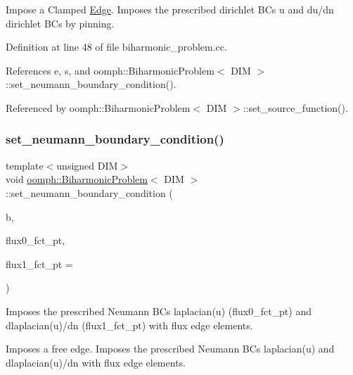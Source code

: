 Impose a Clamped \hyperlink{classoomph_1_1Edge}{Edge}. Imposes the prescribed dirichlet B\+Cs u and du/dn dirichlet B\+Cs by pinning. 

Definition at line 48 of file biharmonic\+\_\+problem.\+cc.



References e, s, and oomph\+::\+Biharmonic\+Problem$<$ D\+I\+M $>$\+::set\+\_\+neumann\+\_\+boundary\+\_\+condition().



Referenced by oomph\+::\+Biharmonic\+Problem$<$ D\+I\+M $>$\+::set\+\_\+source\+\_\+function().

\mbox{\label{classoomph_1_1BiharmonicProblem_a19509193167f4b969aa9f6cb6c2586b2}} 
\subsubsection{\texorpdfstring{set\+\_\+neumann\+\_\+boundary\+\_\+condition()}{set\_neumann\_boundary\_condition()}}
{\footnotesize\ttfamily template$<$unsigned D\+IM$>$ \\
void \hyperlink{classoomph_1_1BiharmonicProblem}{oomph\+::\+Biharmonic\+Problem}$<$ D\+IM $>$\+::set\+\_\+neumann\+\_\+boundary\+\_\+condition (\begin{DoxyParamCaption}\item[{const unsigned \&}]{b,  }\item[{\hyperlink{classoomph_1_1BiharmonicFluxElement}{Biharmonic\+Flux\+Element}$<$ 2 $>$\+::Flux\+Fct\+Pt}]{flux0\+\_\+fct\+\_\+pt,  }\item[{\hyperlink{classoomph_1_1BiharmonicFluxElement}{Biharmonic\+Flux\+Element}$<$ 2 $>$\+::Flux\+Fct\+Pt}]{flux1\+\_\+fct\+\_\+pt = {} }\end{DoxyParamCaption})\hspace{0.3cm}{\ttfamily [protected]}}



Imposes the prescribed Neumann B\+Cs laplacian(u) (flux0\+\_\+fct\+\_\+pt) and dlaplacian(u)/dn (flux1\+\_\+fct\+\_\+pt) with flux edge elements. 

Imposes a \textquotesingle{}free\textquotesingle{} edge. Imposes the prescribed Neumann B\+Cs laplacian(u) and dlaplacian(u)/dn with flux edge elements. 

